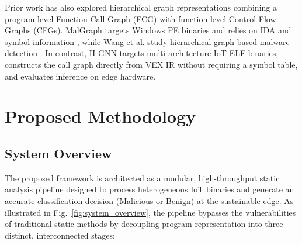 \documentclass{llncs}
\begin{document}
Prior work has also explored hierarchical graph representations
combining a program-level Function Call Graph (FCG) with function-level
Control Flow Graphs (CFGs). MalGraph targets Windows PE binaries and relies
on IDA and symbol information \cite{malgraph2022}, while Wang et al. study
hierarchical graph-based malware detection \cite{wang2021hier}. In contrast,
H-GNN targets multi-architecture IoT ELF binaries, constructs the call graph
directly from VEX IR without requiring a symbol table, and evaluates inference
on edge hardware.


\section{Proposed Methodology}
\label{sec:methodology}

\subsection{System Overview}
The proposed  framework is architected as a modular, high-throughput static analysis pipeline designed to process heterogeneous IoT binaries and generate an accurate classification decision (Malicious or Benign) at the sustainable edge. As illustrated in Fig.~\ref{fig:system_overview}, the pipeline bypasses the vulnerabilities of traditional static methods by decoupling program representation into three distinct, interconnected stages:
\end{document}

